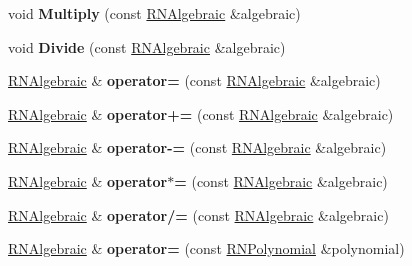 \begin{DoxyCompactItemize}
\item 
void {\bfseries Multiply} (const \hyperlink{class_r_n_algebraic}{R\+N\+Algebraic} \&algebraic)\hypertarget{class_r_n_algebraic_a73f8668fc503c710a4220b62c86d4d40}{}\label{class_r_n_algebraic_a73f8668fc503c710a4220b62c86d4d40}

\item 
void {\bfseries Divide} (const \hyperlink{class_r_n_algebraic}{R\+N\+Algebraic} \&algebraic)\hypertarget{class_r_n_algebraic_ae0bb41535cc917c84eacab50259c655c}{}\label{class_r_n_algebraic_ae0bb41535cc917c84eacab50259c655c}

\item 
\hyperlink{class_r_n_algebraic}{R\+N\+Algebraic} \& {\bfseries operator=} (const \hyperlink{class_r_n_algebraic}{R\+N\+Algebraic} \&algebraic)\hypertarget{class_r_n_algebraic_ac0d5e15b83e067ffe99d2958bdf3e8b6}{}\label{class_r_n_algebraic_ac0d5e15b83e067ffe99d2958bdf3e8b6}

\item 
\hyperlink{class_r_n_algebraic}{R\+N\+Algebraic} \& {\bfseries operator+=} (const \hyperlink{class_r_n_algebraic}{R\+N\+Algebraic} \&algebraic)\hypertarget{class_r_n_algebraic_a4fdb82cdce380cc888a5b71160aaff73}{}\label{class_r_n_algebraic_a4fdb82cdce380cc888a5b71160aaff73}

\item 
\hyperlink{class_r_n_algebraic}{R\+N\+Algebraic} \& {\bfseries operator-\/=} (const \hyperlink{class_r_n_algebraic}{R\+N\+Algebraic} \&algebraic)\hypertarget{class_r_n_algebraic_a1d17a58bf9eef5a379f889eefb9a1da7}{}\label{class_r_n_algebraic_a1d17a58bf9eef5a379f889eefb9a1da7}

\item 
\hyperlink{class_r_n_algebraic}{R\+N\+Algebraic} \& {\bfseries operator$\ast$=} (const \hyperlink{class_r_n_algebraic}{R\+N\+Algebraic} \&algebraic)\hypertarget{class_r_n_algebraic_a8a1a097a66ff6ea3baaca6f13bca7828}{}\label{class_r_n_algebraic_a8a1a097a66ff6ea3baaca6f13bca7828}

\item 
\hyperlink{class_r_n_algebraic}{R\+N\+Algebraic} \& {\bfseries operator/=} (const \hyperlink{class_r_n_algebraic}{R\+N\+Algebraic} \&algebraic)\hypertarget{class_r_n_algebraic_a65c5220bc551d32d03435fe6153e0619}{}\label{class_r_n_algebraic_a65c5220bc551d32d03435fe6153e0619}

\item 
\hyperlink{class_r_n_algebraic}{R\+N\+Algebraic} \& {\bfseries operator=} (const \hyperlink{class_r_n_polynomial}{R\+N\+Polynomial} \&polynomial)\hypertarget{class_r_n_algebraic_a4d83e1d19ed05eed4a1236b5647452dd}{}\label{class_r_n_algebraic_a4d83e1d19ed05eed4a1236b5647452dd}


\end{DoxyCompactItemize}
